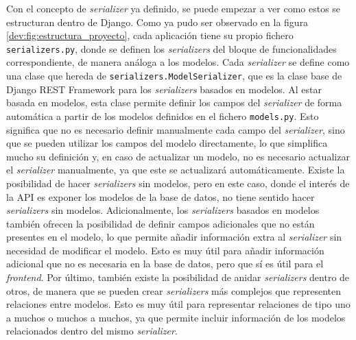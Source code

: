 Con el concepto de \textit{serializer} ya definido, se puede empezar a ver como estos se estructuran dentro de Django. Como ya pudo ser observado en la figura \ref{dev:fig:estructura_proyecto}, cada aplicación tiene su propio fichero \texttt{serializers.py}, donde se definen los \textit{serializers} del bloque de funcionalidades correspondiente, de manera análoga a los modelos. Cada \textit{serializer} se define como una clase que hereda de \texttt{serializers.ModelSerializer}, que es la clase base de Django REST Framework para los \textit{serializers} basados en modelos. Al estar basada en modelos, esta clase permite definir los campos del \textit{serializer} de forma automática a partir de los modelos definidos en el fichero \texttt{models.py}. Esto significa que no es necesario definir manualmente cada campo del \textit{serializer}, sino que se pueden utilizar los campos del modelo directamente, lo que simplifica mucho su definición y, en caso de actualizar un modelo, no es necesario actualizar el \textit{serializer} manualmente, ya que este se actualizará automáticamente. Existe la posibilidad de hacer \textit{serializers} sin modelos, pero en este caso, donde el interés de la API es exponer los modelos de la base de datos, no tiene sentido hacer \textit{serializers} sin modelos. Adicionalmente, los \textit{serializers} basados en modelos también ofrecen la posibilidad de definir campos adicionales que no están presentes en el modelo, lo que permite añadir información extra al \textit{serializer} sin necesidad de modificar el modelo. Esto es muy útil para añadir información adicional que no es necesaria en la base de datos, pero que sí es útil para el \textit{frontend}. Por último, también existe la posibilidad de anidar \textit{serializers} dentro de otros, de manera que se pueden crear \textit{serializers} más complejos que representen relaciones entre modelos. Esto es muy útil para representar relaciones de tipo uno a muchos o muchos a muchos, ya que permite incluir información de los modelos relacionados dentro del mismo \textit{serializer}.

\begin{center}
    \begin{minipage}{0.8\textwidth}
        
    \end{minipage}
\end{center}

